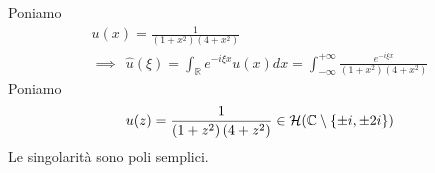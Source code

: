 Poniamo
\begin{gather*}
u( x) =\frac{1}{\left( 1+x^{2}\right)\left( 4+x^{2}\right)}\\
\implies \ \ \hat{u}( \xi ) =\int _{\mathbb{R}} e^{-i\xi x} u( x) dx=\int ^{+\infty }_{-\infty }\frac{e^{-i\xi x}}{\left( 1+x^{2}\right)\left( 4+x^{2}\right)}
\end{gather*}
Poniamo
\begin{equation*}
u( z) =\frac{1}{\left( 1+z^{2}\right)\left( 4+z^{2}\right)} \in \Hc (\CC  \setminus \{\pm i,\pm 2i\})
\end{equation*}
Le singolarità sono poli semplici.


\begin{figure}[htpb]
	\centering
{} %

\begin{tikzpicture}[x=0.75pt,y=0.75pt,yscale=-1,xscale=1]


\end{tikzpicture}
\end{figure}
